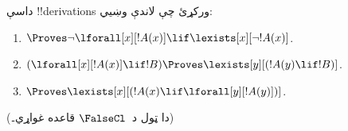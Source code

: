 \documentclass[../../../include/open-logic-section]{subfiles}
\begin{document}
\begin{prob}
داسې !!{derivation}s ورکړئ چې لاندې وښيي:
\begin{enumerate}
\item $\Proves \lnot\lforall[x][!A(x)] \lif \lexists[x][\lnot!A(x)]$.
\item $(\lforall[x][!A(x)] \lif !B) \Proves \lexists[y][(!A(y) \lif !B)]$.
\item $\Proves \lexists[x][(!A(x) \lif \lforall[y][!A(y)])]$.
\end{enumerate}
(دا ټول د~$\FalseCl$ قاعده غواړي۔)
\end{prob}
\end{document}

